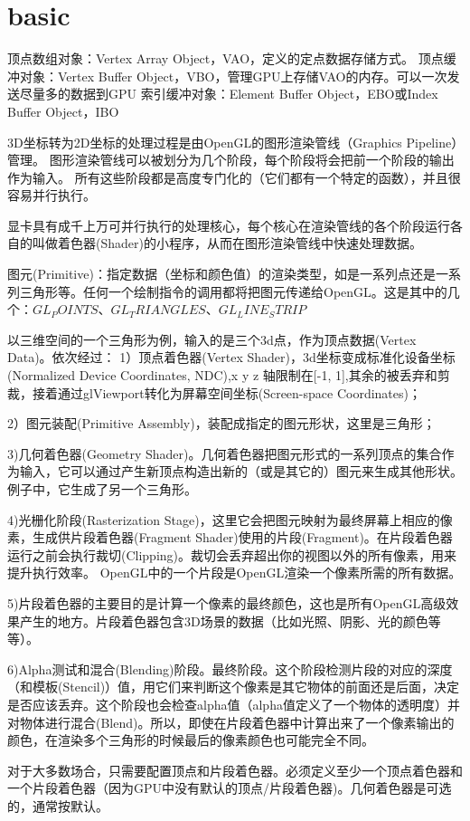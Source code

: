 \documentclass[UTF8]{article}
\begin{document}

\section{basic}

顶点数组对象：Vertex Array Object，VAO，定义的定点数据存储方式。
顶点缓冲对象：Vertex Buffer Object，VBO，管理GPU上存储VAO的内存。可以一次发送尽量多的数据到GPU
索引缓冲对象：Element Buffer Object，EBO或Index Buffer Object，IBO

3D坐标转为2D坐标的处理过程是由OpenGL的图形渲染管线（Graphics Pipeline）管理。
图形渲染管线可以被划分为几个阶段，每个阶段将会把前一个阶段的输出作为输入。
所有这些阶段都是高度专门化的（它们都有一个特定的函数），并且很容易并行执行。

显卡具有成千上万可并行执行的处理核心，每个核心在渲染管线的各个阶段运行各自的叫做着色器(Shader)的小程序，从而在图形渲染管线中快速处理数据。


图元(Primitive)：指定数据（坐标和颜色值）的渲染类型，如是一系列点还是一系列三角形等。任何一个绘制指令的调用都将把图元传递给OpenGL。这是其中的几个：$GL_POINTS、GL_TRIANGLES、GL_LINE_STRIP$

以三维空间的一个三角形为例，输入的是三个3d点，作为顶点数据(Vertex Data)。依次经过：
1）顶点着色器(Vertex Shader)，3d坐标变成标准化设备坐标(Normalized Device Coordinates, NDC),x y z 轴限制在[-1, 1],其余的被丢弃和剪裁，接着通过glViewport转化为屏幕空间坐标(Screen-space Coordinates)；

2）图元装配(Primitive Assembly)，装配成指定的图元形状，这里是三角形；

3)几何着色器(Geometry Shader)。几何着色器把图元形式的一系列顶点的集合作为输入，它可以通过产生新顶点构造出新的（或是其它的）图元来生成其他形状。例子中，它生成了另一个三角形。

4)光栅化阶段(Rasterization Stage)，这里它会把图元映射为最终屏幕上相应的像素，生成供片段着色器(Fragment Shader)使用的片段(Fragment)。在片段着色器运行之前会执行裁切(Clipping)。裁切会丢弃超出你的视图以外的所有像素，用来提升执行效率。
OpenGL中的一个片段是OpenGL渲染一个像素所需的所有数据。

5)片段着色器的主要目的是计算一个像素的最终颜色，这也是所有OpenGL高级效果产生的地方。片段着色器包含3D场景的数据（比如光照、阴影、光的颜色等等）。

6)Alpha测试和混合(Blending)阶段。最终阶段。这个阶段检测片段的对应的深度（和模板(Stencil)）值，用它们来判断这个像素是其它物体的前面还是后面，决定是否应该丢弃。这个阶段也会检查alpha值（alpha值定义了一个物体的透明度）并对物体进行混合(Blend)。所以，即使在片段着色器中计算出来了一个像素输出的颜色，在渲染多个三角形的时候最后的像素颜色也可能完全不同。

对于大多数场合，只需要配置顶点和片段着色器。必须定义至少一个顶点着色器和一个片段着色器（因为GPU中没有默认的顶点/片段着色器)。几何着色器是可选的，通常按默认。
\end{document}
